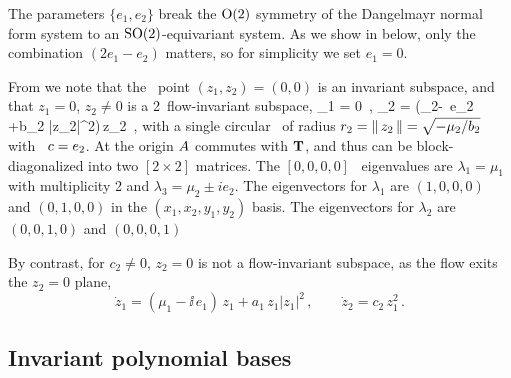 The parameters $\{e_1,e_2\}$ break the $\textrm{O}(2)$ symmetry of the
Dangelmayr normal form system to an $\textrm{SO}(2)$-equivariant
system. As we show in  below, only the combination
$(2e_1-e_2)$ matters, so for simplicity we set $e_1=0$.

From  we note that the \eqv\ point \((z_1,z_2)=(0,0)\)
is an invariant subspace, and that $z_1=0$, $z_2 \neq 0$ is a 2\dmn\
flow-invariant subspace,
\beq
  _1 = 0
\,,\qquad
  _2 = (\mu_2-\ii\, e_2 +b_2 |z_2|^2)\,{z_2}
\,,
with a single circular \reqv\ of radius $r_2 = \norm{z_2} = \sqrt{-\mu_2/b_2}$ with
\phaseVel\ $\velRel=e_2$.
At the origin $\Mvar$ commutes with $\Lg$, and thus can be block-diagonalized
into two $[2\!\times\!2]$ matrices.
The $[0,0,0,0]$ \eqv\ eigenvalues are $\lambda_1 = \mu_1$ with multiplicity 2 and
             $\lambda_3 = \mu_2 \pm i e_2$. The eigenvectors for
             $\lambda_1$ are $(1,0,0,0)$ and $(0,1,0,0)$ in the
             $(x_1,x_2,y_1,y_2)$ basis.
             The eigenvectors for
             $\lambda_2$ are $(0,0,1,0)$ and $(0,0,0,1)$



By contrast, for $c_2 \neq 0$, $z_2 =0$ is not a flow-invariant subspace,
as the flow exits the $z_2 =0$ plane,
\[
  \dot{z}_1 = (\mu_1-\ii\, e_1)\,z_1+a_1\,z_1|z_1|^2
\,,\qquad
  \dot{z}_2 = c_2\,z_1^2
\,.
\]

\subsection{Invariant polynomial bases}
\label{s:invPol}

